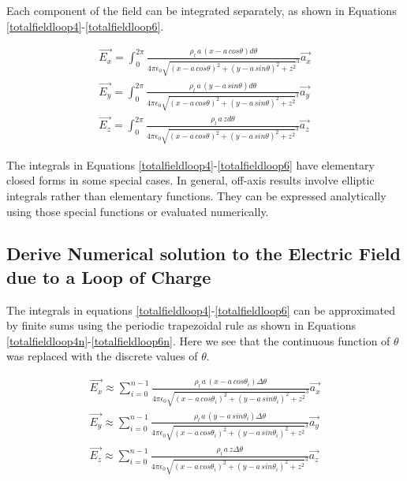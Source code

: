 \documentclass{ximera}
\begin{document}
Each component of the field can be integrated separately, as shown in Equations \ref{totalfieldloop4}-\ref{totalfieldloop6}.



\begin{eqnarray}
\vec{E_x}= \int_0^{2\pi}\frac{\rho_l \,a \,        (x -  a \,cos{\theta})         d\theta }{4 \pi \epsilon_{0} {  \sqrt{(x - a \,cos{\theta})^2 +(y - a \,sin{\theta})^2 +z ^2}  }^3}    \vec{a_x}  \label{totalfieldloop4} \\
\vec{E_y}=  \int_0^{2\pi}\frac{\rho_l \, a \,   (y - a \,sin{\theta})   d\theta }{4 \pi \epsilon_{0} {  \sqrt{(x - a \,cos{\theta})^2 +(y - a \,sin{\theta})^2 +z ^2}  }^3}  \vec{a_y}  \label{totalfieldloop5} \\
\vec{E_z}=  \int_0^{2\pi}\frac{\rho_l \, a \,  z   d\theta }{4 \pi \epsilon_{0} {  \sqrt{(x - a \,cos{\theta})^2 +(y - a \,sin{\theta})^2 +z ^2}  }^3}  \vec{a_z} \label{totalfieldloop6}
\end{eqnarray}

The integrals in Equations \ref{totalfieldloop4}-\ref{totalfieldloop6}  have elementary closed forms in some special cases. In general, off-axis results involve elliptic integrals rather than elementary functions. They can be expressed analytically using those special functions or evaluated numerically.


\subsection{Derive Numerical solution to the Electric Field due to a Loop of Charge}

The integrals in equations \ref{totalfieldloop4}-\ref{totalfieldloop6} can be approximated by finite sums using the periodic trapezoidal rule as shown in Equations \ref{totalfieldloop4n}-\ref{totalfieldloop6n}.  Here we see that the continuous function of $\theta$ was replaced with the discrete values of  $\theta$.




\begin{eqnarray}
\vec{E_x}\approx \sum_{i=0}^{n-1}\frac{\rho_l \,a \,        (x -  a \,cos{\theta_i})         \Delta \theta }{4 \pi \epsilon_{0} {  \sqrt{(x - a \,cos{\theta_i})^2 +(y - a \,sin{\theta_i})^2 +z ^2}  }^3}    \vec{a_x}  \label{totalfieldloop4n} \\
\vec{E_y}\approx \sum_{i=0}^{n-1}\frac{\rho_l \, a \,   (y - a \,sin{\theta_i})  \Delta  \theta }{4 \pi \epsilon_{0} {  \sqrt{(x - a \,cos{\theta_i})^2 +(y - a \,sin{\theta_i})^2 +z ^2}  }^3}  \vec{a_y}  \label{totalfieldloop5n} \\
\vec{E_z}\approx \sum_{i=0}^{n-1}\frac{\rho_l \, a \,  z   \Delta \theta }{4 \pi \epsilon_{0} {  \sqrt{(x - a \,cos{\theta_i})^2 +(y - a \,sin{\theta_i})^2 +z ^2}  }^3}  \vec{a_z} \label{totalfieldloop6n}
\end{eqnarray}
\end{document}
